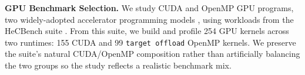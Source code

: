 \textbf{GPU Benchmark Selection.}
We study CUDA and OpenMP GPU programs, two widely-adopted accelerator programming models \cite{kadoshQuantifyingOpenMPStatistical2023}, using workloads from the HeCBench suite \cite{HeCBenchMasterZjinlcf, jinBenchmarkSuiteImproving2023}.
From this suite, we build and profile 254 GPU kernels across two runtimes: 155 CUDA and 99 \texttt{target offload} OpenMP kernels.
We preserve the suite's natural CUDA/OpenMP composition rather than artificially balancing the two groups so the study reflects a realistic benchmark mix.



